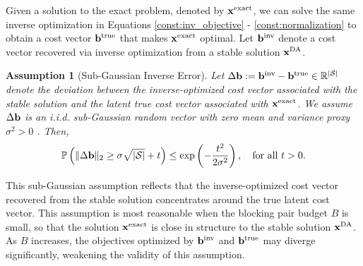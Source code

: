 \documentclass[11pt]{article}
\newtheorem{assumption}{Assumption}
\begin{document}
Given a solution to the exact problem, denoted by ${\bf x}^{\text{exact}}$, we can solve the same inverse optimization in Equations \eqref{const:inv_objective} - \eqref{const:normalization} to obtain a cost vector ${\bf b}^{\text{true}}$ that makes ${\bf x}^{\text{exact}}$ optimal. 
Let \( {\bf b}^{\text{inv}} \) denote a cost vector recovered via inverse optimization from a stable solution \( {\bf x}^{\text{DA}} \). 

\begin{assumption}[Sub-Gaussian Inverse Error]\label{assum:subgaussian}
Let \( \Delta {\bf b} := {\bf b}^{\textnormal{inv}} - {\bf b}^{\textnormal{true}} \in\mathbb{R}^{|\mathcal{S}|} \) denote the deviation between the inverse-optimized cost vector associated with the stable solution and the latent true cost vector associated with ${\bf x}^{\text{exact}}$. We assume \( \Delta {\bf b} \) is an i.i.d. sub-Gaussian random vector with zero mean and variance proxy \( \sigma^2 > 0\) .
Then, 
\[
\mathbb{P}\left( \|\Delta {\bf b}\|_2 \geq \sigma \sqrt{|\mathcal{S}|} + t \right)
\leq \exp\left( -\frac{t^2}{2\sigma^2} \right), \quad \text{for all } t > 0.
\]
\end{assumption}
This sub-Gaussian assumption reflects that the inverse-optimized cost vector recovered from the stable solution concentrates around the true latent cost vector. This assumption is most reasonable when the blocking pair budget \( B \) is small, so that the solution \( {\bf x}^{\text{exact}} \) is close in structure to the stable solution \( {\bf x}^{\text{DA}} \). As \( B \) increases, the objectives optimized by \( {\bf b}^{\text{inv}} \) and \( {\bf b}^{\text{true}} \) may diverge significantly, weakening the validity of this assumption.
\end{document}
